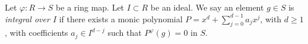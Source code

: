 \begin{definition}
\label{editorial-source-definition-integral-over-ideal}
Let $\varphi : R \to S$ be a ring map.
Let $I \subset R$ be an ideal.
We say an element $g \in S$ is
{\it integral over $I$} if
there exists a monic
polynomial $P = x^d + \sum_{j=0}^{d-1} a_j x^j$, with $d\geq1$,
with coefficients $a_j \in I^{d-j}$ such
that $P^\varphi(g) = 0$ in $S$.
\end{definition}